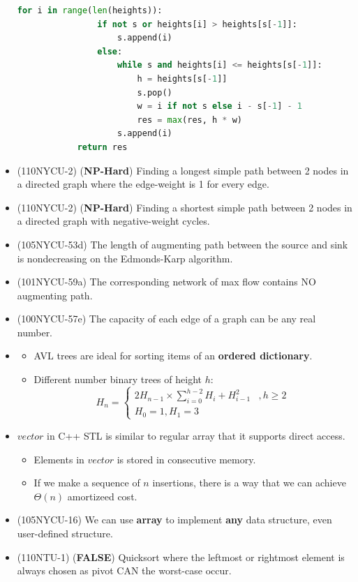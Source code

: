 \begin{itemize}
\begin{lstlisting}[caption={Largest Rectangle in Histogram.}, captionpos=b, language=Python]
            for i in range(len(heights)):
                if not s or heights[i] > heights[s[-1]]:
                    s.append(i)
                else:
                    while s and heights[i] <= heights[s[-1]]:
                        h = heights[s[-1]]
                        s.pop()
                        w = i if not s else i - s[-1] - 1
                        res = max(res, h * w)
                    s.append(i)
            return res
    \end{lstlisting}
    \item (110NYCU-2) (\textbf{NP-Hard}) Finding a longest simple path between 2 nodes in a directed graph where the edge-weight is 1 for every edge.
    \item (110NYCU-2) (\textbf{NP-Hard}) Finding a shortest simple path between 2 nodes in a directed graph with negative-weight cycles.
    \item (105NYCU-53d) The length of augmenting path between the source and sink is nondecreasing on the Edmonds-Karp algorithm.
    \item (101NYCU-59a) The corresponding network of max flow contains NO augmenting path.
    \item (100NYCU-57e) The capacity of each edge of a graph can be any real number.
    \item \begin{itemize}
        \item AVL trees are ideal for sorting items of an \textbf{ordered dictionary}.
        \item Different number binary trees of height $h$: \begin{equation}
            H_n = \begin{cases}
                2H_{n - 1} \times \sum\limits_{i = 0}^{h - 2}H_i + H_{i - 1}^2 &, h \ge 2\\
                H_0 = 1, H_1 = 3 
            \end{cases}
        \end{equation}
    \end{itemize}
    \item $vector$ in C++ STL is similar to regular array that it supports direct access. \begin{itemize}
        \item Elements in $vector$ is stored in consecutive memory.
        \item If we make a sequence of $n$ insertions, there is a way that we can achieve $\Theta(n)$ amortizeed cost. 
    \end{itemize}
    \item (105NYCU-16) We can use \textbf{array} to implement \textbf{any} data structure, even user-defined structure.
    \item (110NTU-1) (\textbf{FALSE}) Quicksort where the leftmost or rightmost element is always chosen as pivot CAN the worst-case occur.
\end{itemize}

\pagebreak
